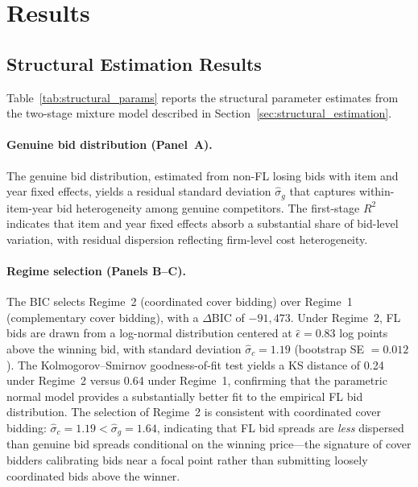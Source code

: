 
\section{Results}
\label{sec:results}


\subsection{Structural Estimation Results}
\label{sec:results_structural}

Table~\ref{tab:structural_params} reports the structural parameter
estimates from the two-stage mixture model described in
Section~\ref{sec:structural_estimation}.

\paragraph{Genuine bid distribution (Panel~A).}
The genuine bid distribution, estimated from non-FL losing bids with
item and year fixed effects, yields a residual standard deviation
$\hat{\sigma}_g$ that captures within-item-year bid heterogeneity
among genuine competitors. The first-stage $R^2$ indicates that item
and year fixed effects absorb a substantial share of bid-level
variation, with residual dispersion reflecting firm-level cost
heterogeneity.

\paragraph{Regime selection (Panels B--C).}
The BIC selects Regime~2 (coordinated cover bidding) over Regime~1
(complementary cover bidding), with a $\Delta$BIC of $-91{,}473$.
Under Regime~2, FL bids are drawn from a log-normal distribution
centered at $\hat{\epsilon} = 0.83$ log points above the winning bid,
with standard deviation $\hat{\sigma}_c = 1.19$ (bootstrap
SE $= 0.012$). The Kolmogorov--Smirnov goodness-of-fit test yields a
KS distance of 0.24 under Regime~2 versus 0.64 under Regime~1,
confirming that the parametric normal model provides a substantially
better fit to the empirical FL bid distribution.
The selection of Regime~2 is consistent with coordinated cover bidding:
$\hat{\sigma}_c = 1.19 < \hat{\sigma}_g = 1.64$, indicating that
FL bid spreads are \emph{less} dispersed than genuine bid spreads
conditional on the winning price---the signature of cover bidders
calibrating bids near a focal point rather than submitting loosely
coordinated bids above the winner.

